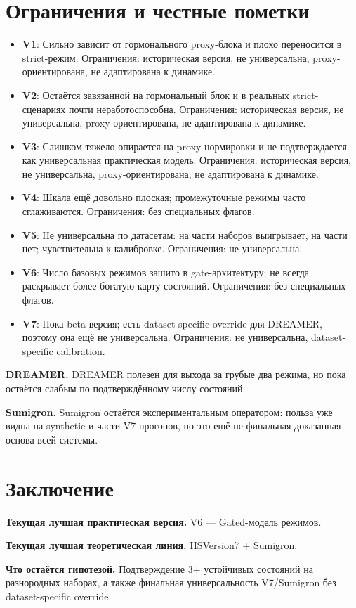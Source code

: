 \documentclass[11pt,a4paper]{article}
\begin{document}
\section{Ограничения и честные пометки}
\begin{itemize}[leftmargin=1.2cm]
\item \textbf{V1}: Сильно зависит от гормонального proxy-блока и плохо переносится в strict-режим. Ограничения: историческая версия, не универсальна, proxy-ориентирована, не адаптирована к динамике.
\item \textbf{V2}: Остаётся завязанной на гормональный блок и в реальных strict-сценариях почти неработоспособна. Ограничения: историческая версия, не универсальна, proxy-ориентирована, не адаптирована к динамике.
\item \textbf{V3}: Слишком тяжело опирается на proxy-нормировки и не подтверждается как универсальная практическая модель. Ограничения: историческая версия, не универсальна, proxy-ориентирована, не адаптирована к динамике.
\item \textbf{V4}: Шкала ещё довольно плоская; промежуточные режимы часто сглаживаются. Ограничения: без специальных флагов.
\item \textbf{V5}: Не универсальна по датасетам: на части наборов выигрывает, на части нет; чувствительна к калибровке. Ограничения: не универсальна.
\item \textbf{V6}: Число базовых режимов зашито в gate-архитектуру; не всегда раскрывает более богатую карту состояний. Ограничения: без специальных флагов.
\item \textbf{V7}: Пока beta-версия; есть dataset-specific override для DREAMER, поэтому она ещё не универсальна. Ограничения: не универсальна, dataset-specific calibration.
\end{itemize}

\textbf{DREAMER.} DREAMER полезен для выхода за грубые два режима, но пока остаётся слабым по подтверждённому числу состояний.

\textbf{Sumigron.} Sumigron остаётся экспериментальным оператором: польза уже видна на synthetic и части V7-прогонов, но это ещё не финальная доказанная основа всей системы.

\section{Заключение}
\textbf{Текущая лучшая практическая версия.} V6 --- Gated-модель режимов.

\textbf{Текущая лучшая теоретическая линия.} IISVersion7 + Sumigron.

\textbf{Что остаётся гипотезой.} Подтверждение 3+ устойчивых состояний на разнородных наборах, а также финальная универсальность V7/Sumigron без dataset-specific override.
\end{document}
